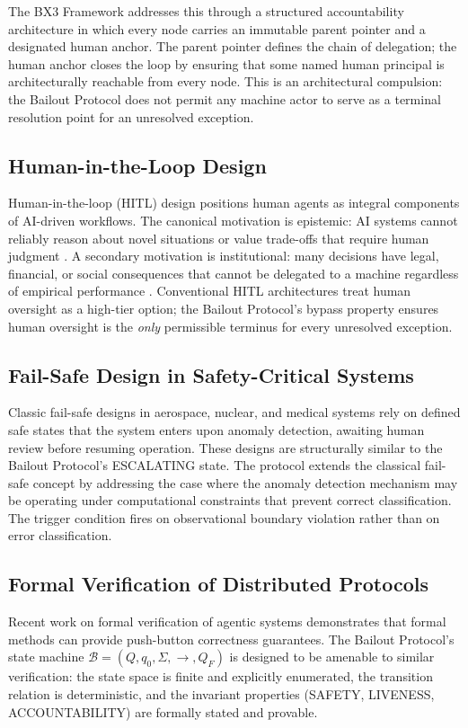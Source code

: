 \documentclass[12pt]{article}
\newcommand{\bxthree}{\mbox{BX3}}
\begin{document}
The \bxthree{} Framework addresses this through a structured accountability architecture in which every node carries an immutable parent pointer and a designated human anchor. The parent pointer defines the chain of delegation; the human anchor closes the loop by ensuring that some named human principal is architecturally reachable from every node. This is an architectural compulsion: the Bailout Protocol does not permit any machine actor to serve as a terminal resolution point for an unresolved exception.

\subsection{Human-in-the-Loop Design}
Human-in-the-loop (HITL) design positions human agents as integral components of AI-driven workflows. The canonical motivation is epistemic: AI systems cannot reliably reason about novel situations or value trade-offs that require human judgment \citep{tristr81}. A secondary motivation is institutional: many decisions have legal, financial, or social consequences that cannot be delegated to a machine regardless of empirical performance \citep{bansal2019}. Conventional HITL architectures treat human oversight as a high-tier option; the Bailout Protocol's bypass property ensures human oversight is the \emph{only} permissible terminus for every unresolved exception.

\subsection{Fail-Safe Design in Safety-Critical Systems}
Classic fail-safe designs in aerospace, nuclear, and medical systems rely on defined safe states that the system enters upon anomaly detection, awaiting human review before resuming operation. These designs are structurally similar to the Bailout Protocol's ESCALATING state. The protocol extends the classical fail-safe concept by addressing the case where the anomaly detection mechanism may be operating under computational constraints that prevent correct classification. The trigger condition fires on observational boundary violation rather than on error classification.

\subsection{Formal Verification of Distributed Protocols}
Recent work on formal verification of agentic systems \citep{rashie2026} demonstrates that formal methods can provide push-button correctness guarantees. The Bailout Protocol's state machine $\mathcal{B} = (Q, q_0, \Sigma, \rightarrow, Q_F)$ is designed to be amenable to similar verification: the state space is finite and explicitly enumerated, the transition relation is deterministic, and the invariant properties (SAFETY, LIVENESS, ACCOUNTABILITY) are formally stated and provable.
\end{document}
